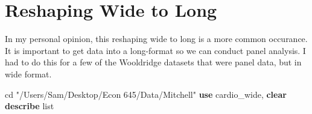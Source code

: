 \documentclass[
]{book}
\newenvironment{Shaded}{\begin{snugshade}}{\end{snugshade}}
\newcommand{\KeywordTok}[1]{\textcolor[rgb]{0.13,0.29,0.53}{\textbf{#1}}}
\newcommand{\NormalTok}[1]{#1}
\newcommand{\OtherTok}[1]{\textcolor[rgb]{0.56,0.35,0.01}{#1}}
\newcommand{\StringTok}[1]{\textcolor[rgb]{0.31,0.60,0.02}{#1}}
\begin{document}
\section{Reshaping Wide to Long}\label{reshaping-wide-to-long}

In my personal opinion, this reshaping wide to long is a more common occurance. It is important to get data into a long-format so we can conduct panel analysis. I had to do this for a few of the Wooldridge datasets that were panel data, but in wide format.

\begin{Shaded}
\begin{Highlighting}[]
\NormalTok{cd }\StringTok{"/Users/Sam/Desktop/Econ 645/Data/Mitchell"}
\KeywordTok{use}\NormalTok{ cardio\_wide, }\KeywordTok{clear}
\KeywordTok{describe}
\OtherTok{list}
\end{Highlighting}
\end{Shaded}
\end{document}
